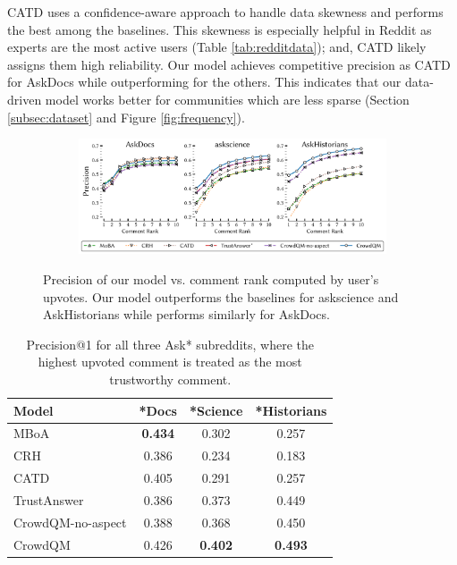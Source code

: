 CATD uses a confidence-aware approach to handle data skewness and performs the best among the baselines. This skewness is especially helpful in Reddit as experts are the most active users (Table \ref{tab:redditdata}); and, CATD likely assigns them high reliability.
Our model achieves competitive precision as CATD for AskDocs while outperforming for the others. This indicates that our data-driven model works better for communities which are less sparse (Section \ref{subsec:dataset} and Figure \ref{fig:frequency}).

\begin{figure}[tbh]
\begin{subfigure}{\linewidth}
\centering
\includegraphics[scale=0.61]{images/Precision.pdf}
\end{subfigure}%
\caption{\label{fig:comment}Precision of our model vs. comment rank computed by user's upvotes. Our model outperforms the baselines for askscience and AskHistorians while performs similarly for AskDocs.}
\end{figure}

\begin{table}[tbh]
  \centering
\begin{tabular}{l | c c c }
\toprule %
 Model &  *Docs & *Science & *Historians \\
  \midrule
 MBoA                 & \textbf{0.434} & 0.302 & 0.257 \\
 CRH                                         & 0.386 & 0.234 & 0.183 \\
 CATD                                     & 0.405 & 0.291 & 0.257 \\
 TrustAnswer                         & 0.386 & 0.373 & 0.449  \\
 CrowdQM-no-aspect                               & 0.388 & 0.368 & 0.450  \\
 CrowdQM                  & 0.426 & \textbf{0.402} & \textbf{0.493}  \\
 \bottomrule
\end{tabular}
\caption{\label{tab:pup} Precision@1 for all three Ask* subreddits, where the highest upvoted comment is  treated as the most trustworthy comment.}
\end{table}


